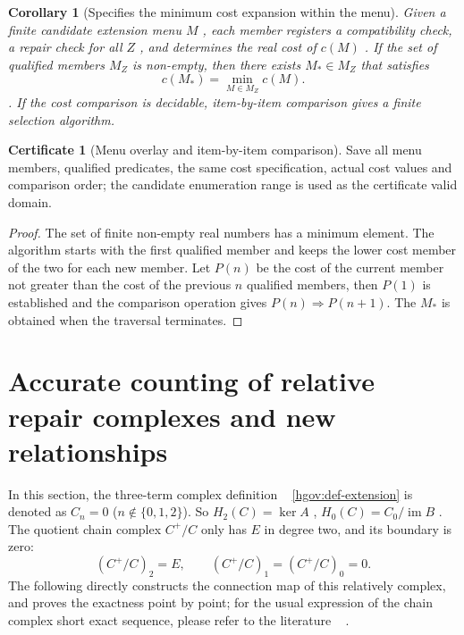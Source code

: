 \documentclass[12pt,a4paper,openany,notitlepage]{report}
\theoremstyle{plain}
\newtheorem{corollary}[theorem]{Corollary}
\theoremstyle{definition}
\newtheorem*{certificate}{Certificate}
\theoremstyle{remark}
\def\mathcal#1{#1}\def\mathsf#1{#1}\def\mathbb#1{#1}%
\begin{document}
\begin{CJK*}
\begin{corollary}
[Specifies the minimum cost expansion within the menu]\label{hgov:cor-finite-cost}
Given a finite candidate extension menu $\mathcal M$ , each member registers a compatibility check, a repair check for all $Z$ , and determines the real cost of $c(M)$ . If the set of qualified members $\mathcal M_Z$ is non-empty, then there exists $M_*\in\mathcal M_Z$ that satisfies \[
 c(M_*)=\min_{M\in\mathcal M_Z}c(M).
\]. If the cost comparison is decidable, item-by-item comparison gives a finite selection algorithm.\end{corollary}
\begin{certificate}
[Menu overlay and item-by-item comparison]Save all menu members, qualified predicates, the same cost specification, actual cost values and comparison order; the candidate enumeration range is used as the certificate valid domain.\end{certificate}
\begin{proof}
The set of finite non-empty real numbers has a minimum element. The algorithm starts with the first qualified member and keeps the lower cost member of the two for each new member. Let $P(n)$ be the cost of the current member not greater than the cost of the previous $n$ qualified members, then $P(1)$ is established and the comparison operation gives $P(n)\Rightarrow P(n+1)$. The $M_*$ is obtained when the traversal terminates.\end{proof}


\section { Accurate counting of relative repair complexes and new relationships }\label{exp:hom:relative-extension}


In this section, the three-term complex definition ~ \ref{hgov:def-extension} is denoted as $C_n=0$ ($n\notin\{0,1,2\}$). So $H_2(C)=\ker A$ , $H_0(C)=C_0/\operatorname{im}B$ . The quotient chain complex $C^+/C$ only has $E$ in degree two, and its boundary is zero: \[
 (C^+/C)_2=E,\qquad
 (C^+/C)_1=(C^+/C)_0=0.
\] The following directly constructs the connection map of this relatively complex, and proves the exactness point by point; for the usual expression of the chain complex short exact sequence, please refer to the literature ~ \cite{ExtWeibel,ExtStacks}.


\end{CJK*}
\end{document}
